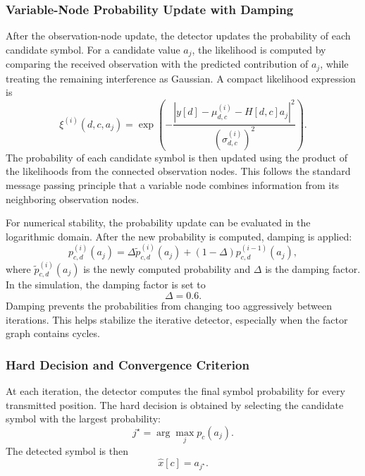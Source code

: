 \subsubsection{Variable-Node Probability Update with Damping}

After the observation-node update, the detector updates the probability of each candidate symbol. For a candidate value \(a_j\), the likelihood is computed by comparing the received observation with the predicted contribution of \(a_j\), while treating the remaining interference as Gaussian. A compact likelihood expression is
\begin{equation}
    \xi^{(i)}(d,c,a_j)
    =
    \exp
    \left(
    -
    \frac{
    \left|
    y[d]
    -
    \mu_{d,c}^{(i)}
    -
    H[d,c]a_j
    \right|^2
    }{
    \left(\sigma_{d,c}^{(i)}\right)^2
    }
    \right).
\end{equation}
The probability of each candidate symbol is then updated using the product of the likelihoods from the connected observation nodes. This follows the standard message passing principle that a variable node combines information from its neighboring observation nodes.

For numerical stability, the probability update can be evaluated in the logarithmic domain. After the new probability is computed, damping is applied:
\begin{equation}
    p_{c,d}^{(i)}(a_j)
    =
    \Delta \widetilde{p}_{c,d}^{(i)}(a_j)
    +
    (1-\Delta)p_{c,d}^{(i-1)}(a_j),
    \label{eq:mp_damping}
\end{equation}
where \(\widetilde{p}_{c,d}^{(i)}(a_j)\) is the newly computed probability and \(\Delta\) is the damping factor. In the simulation, the damping factor is set to
\begin{equation}
    \Delta = 0.6.
\end{equation}
Damping prevents the probabilities from changing too aggressively between iterations. This helps stabilize the iterative detector, especially when the factor graph contains cycles.

\subsubsection{Hard Decision and Convergence Criterion}

At each iteration, the detector computes the final symbol probability for every transmitted position. The hard decision is obtained by selecting the candidate symbol with the largest probability:
\begin{equation}
    j^{\star}
    =
    \arg\max_{j}
    p_c(a_j).
\end{equation}
The detected symbol is then
\begin{equation}
    \widehat{x}[c] = a_{j^{\star}}.
    \label{eq:mp_hard_decision}
\end{equation}

